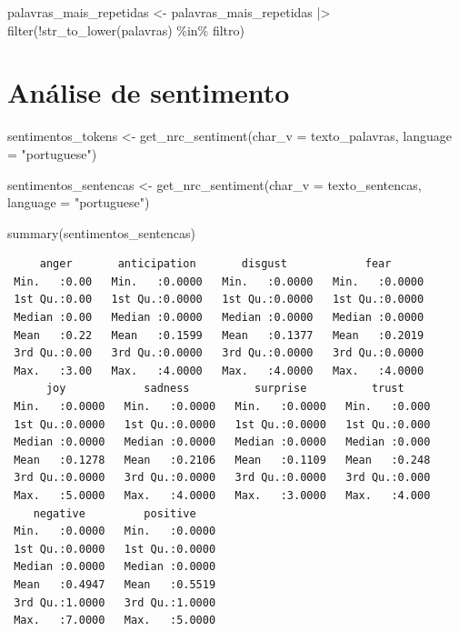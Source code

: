 \documentclass[
  12pt,
]{report}
\newenvironment{Shaded}{\begin{snugshade}}{\end{snugshade}}
\newcommand{\AttributeTok}[1]{\textcolor[rgb]{0.40,0.45,0.13}{#1}}
\newcommand{\FunctionTok}[1]{\textcolor[rgb]{0.28,0.35,0.67}{#1}}
\newcommand{\NormalTok}[1]{\textcolor[rgb]{0.00,0.23,0.31}{#1}}
\newcommand{\OtherTok}[1]{\textcolor[rgb]{0.00,0.23,0.31}{#1}}
\newcommand{\SpecialCharTok}[1]{\textcolor[rgb]{0.37,0.37,0.37}{#1}}
\newcommand{\StringTok}[1]{\textcolor[rgb]{0.13,0.47,0.30}{#1}}
\begin{document}
\begin{Shaded}
\begin{Highlighting}[]
\NormalTok{palavras\_mais\_repetidas }\OtherTok{\textless{}{-}}\NormalTok{ palavras\_mais\_repetidas }\SpecialCharTok{|\textgreater{}} 
  \FunctionTok{filter}\NormalTok{(}\SpecialCharTok{!}\FunctionTok{str\_to\_lower}\NormalTok{(palavras) }\SpecialCharTok{\%in\%}\NormalTok{ filtro)}
\end{Highlighting}
\end{Shaded}

\section{Análise de sentimento}\label{anuxe1lise-de-sentimento}

\begin{Shaded}
\begin{Highlighting}[]
\NormalTok{sentimentos\_tokens }\OtherTok{\textless{}{-}} \FunctionTok{get\_nrc\_sentiment}\NormalTok{(}\AttributeTok{char\_v =}\NormalTok{ texto\_palavras, }\AttributeTok{language =} \StringTok{"portuguese"}\NormalTok{)}

\NormalTok{sentimentos\_sentencas }\OtherTok{\textless{}{-}} \FunctionTok{get\_nrc\_sentiment}\NormalTok{(}\AttributeTok{char\_v =}\NormalTok{ texto\_sentencas, }\AttributeTok{language =} \StringTok{"portuguese"}\NormalTok{)}


\FunctionTok{summary}\NormalTok{(sentimentos\_sentencas)}
\end{Highlighting}
\end{Shaded}

\begin{verbatim}
     anger       anticipation       disgust            fear       
 Min.   :0.00   Min.   :0.0000   Min.   :0.0000   Min.   :0.0000  
 1st Qu.:0.00   1st Qu.:0.0000   1st Qu.:0.0000   1st Qu.:0.0000  
 Median :0.00   Median :0.0000   Median :0.0000   Median :0.0000  
 Mean   :0.22   Mean   :0.1599   Mean   :0.1377   Mean   :0.2019  
 3rd Qu.:0.00   3rd Qu.:0.0000   3rd Qu.:0.0000   3rd Qu.:0.0000  
 Max.   :3.00   Max.   :4.0000   Max.   :4.0000   Max.   :4.0000  
      joy            sadness          surprise          trust      
 Min.   :0.0000   Min.   :0.0000   Min.   :0.0000   Min.   :0.000  
 1st Qu.:0.0000   1st Qu.:0.0000   1st Qu.:0.0000   1st Qu.:0.000  
 Median :0.0000   Median :0.0000   Median :0.0000   Median :0.000  
 Mean   :0.1278   Mean   :0.2106   Mean   :0.1109   Mean   :0.248  
 3rd Qu.:0.0000   3rd Qu.:0.0000   3rd Qu.:0.0000   3rd Qu.:0.000  
 Max.   :5.0000   Max.   :4.0000   Max.   :3.0000   Max.   :4.000  
    negative         positive     
 Min.   :0.0000   Min.   :0.0000  
 1st Qu.:0.0000   1st Qu.:0.0000  
 Median :0.0000   Median :0.0000  
 Mean   :0.4947   Mean   :0.5519  
 3rd Qu.:1.0000   3rd Qu.:1.0000  
 Max.   :7.0000   Max.   :5.0000  
\end{verbatim}
\end{document}
